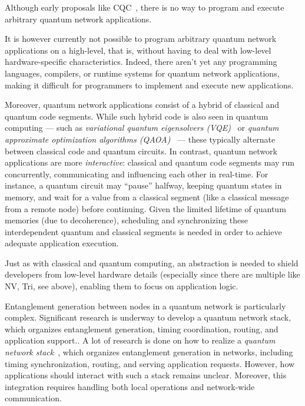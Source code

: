 
Although early proposals like CQC~\cite{dahlberg2018simulaqron}, there is no way to program and execute arbitrary quantum network applications.

It is however currently not possible to program arbitrary quantum network applications on a high-level, that is, without having to deal with low-level hardware-specific characteristics.
Indeed, there aren't yet any programming languages, compilers, or runtime systems for quantum network applications, making it difficult for programmers to implement and execute new applications.



Moreover, quantum network applications consist of a hybrid of classical and quantum code segments.
While such hybrid code is also seen in quantum computing --- such as \textit{variational quantum eigensolvers (VQE)}~\cite{diadamo2021distributed, liu2022layer} or \textit{quantum approximate optimization algorithms (QAOA)}~\cite{farhi2014quantum} ---
these typically alternate between classical code and quantum circuits.
In contrast, quantum network applications are more \textit{interactive}: classical and quantum code segments may run concurrently, communicating and influencing each other in real-time.
For instance, a quantum circuit may ``pause'' halfway, keeping quantum states in memory, and wait for a value from a classical segment (like a classical message from a remote node) before continuing.
Given the limited lifetime of quantum memories (due to decoherence), scheduling and synchronizing these interdependent quantum and classical segments is needed in order to achieve adequate application execution.


Just as with classical and quantum computing, an abstraction is needed to shield developers from low-level hardware details (especially since there are multiple like NV, Tri, see above), enabling them to focus on application logic.

Entanglement generation between nodes in a quantum network is particularly complex.
Significant research is underway to develop a quantum network stack, which organizes entanglement generation, timing coordination, routing, and application support.\cite{caleffi_2017_optimal}.
A lot of research is done on how to realize a \emph{quantum network stack}~\cite{dahlberg2019linklayer,kozlowski2020networklayer}, which organizes entanglement generation in networks, including timing synchronization, routing, and serving application requests.
However, how applications should interact with such a stack remains unclear.
Moreover, this integration requires handling both local operations and network-wide communication.

